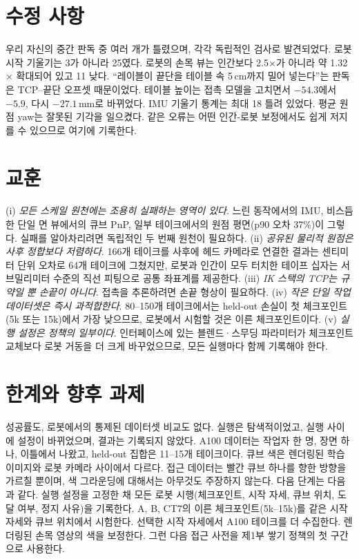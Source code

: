 \documentclass[conference,10pt]{IEEEtran}
\newcommand{\mm}{\,mm\xspace}
\begin{document}
\section{수정 사항}\label{p2:sec:corr}
우리 자신의 중간 판독 중 여러 개가 틀렸으며, 각각 독립적인 검사로 발견되었다. 로봇 시작 기울기는 3\textdegree{}가 아니라
25\textdegree{}였다. 로봇의 손목 뷰는 인간보다 2.5$\times$가 아니라 약 1.32$\times$ 확대되어 있고 11\textdegree{} 낮다.
``레이블이 끝단을 테이블 속 5\,cm까지 밀어 넣는다''는 판독은 TCP--끝단 오프셋 때문이었다. 테이블 높이는 접촉 모델을 고치면서
$-54.3$에서 $-5.9$, 다시 $-27.1$\mm{}로 바뀌었다. IMU 기울기 통계는 최대 18\textdegree{} 틀려 있었다. 평균 원점 yaw는 잘못된
기각을 일으켰다. 같은 오류는 어떤 인간-로봇 보정에서도 쉽게 저지를 수 있으므로 여기에 기록한다.

\section{교훈}\label{p2:sec:lessons}
(i) \emph{모든 스케일 원천에는 조용히 실패하는 영역이 있다}. 느린 동작에서의 IMU, 비스듬한 단일 면 뷰에서의 큐브 PnP,
일부 테이크에서의 원점 평면(p90 오차 37\%)이 그렇다. 실패를 알아차리려면 독립적인 두 번째 원천이 필요하다. (ii) \emph{공유된
물리적 원점은 사후 정합보다 저렴하다}. 166개 테이크를 사후에 헤드 카메라로 연결한 결과는 센티미터 단위 오차로 64개
테이크에 그쳤지만, 로봇과 인간이 모두 터치한 테이프 십자는 서브밀리미터 수준의 직선 피팅으로 공통 좌표계를 제공한다.
(iii) \emph{IK 스택의 TCP는 규약일 뿐 손끝이 아니다}. 접촉을 추론하려면 손끝 형상이 필요하다. (iv) \emph{작은 단일 작업
데이터셋은 즉시 과적합한다}. 80--150개 테이크에서는 held-out 손실이 첫 체크포인트(5k 또는 15k)에서 가장 낮으므로, 로봇에서
시험할 것은 이른 체크포인트이다. (v) \emph{실행 설정은 정책의 일부이다}. 인터페이스에 있는 블렌드·스무딩 파라미터가
체크포인트 교체보다 로봇 거동을 더 크게 바꾸었으므로, 모든 실행마다 함께 기록해야 한다.

\section{한계와 향후 과제}\label{p2:sec:lim}
성공률도, 로봇에서의 통제된 데이터셋 비교도 없다. 실행은 탐색적이었고, 실행 사이에 설정이 바뀌었으며, 결과는 기록되지
않았다. A100 데이터는 작업자 한 명, 장면 하나, 이틀에서 나왔고, held-out 집합은 11--15개 테이크이다. 큐브 색은 렌더링된
학습 이미지와 로봇 카메라 사이에서 다르다. 접근 데이터는 빨간 큐브 하나를 향한 방향을 가르칠 뿐이며, 색 그라운딩에
대해서는 아무것도 주장하지 않는다. 다음 단계는 다음과 같다. 실행 설정을 고정한 채 모든 로봇 시행(체크포인트, 시작 자세,
큐브 위치, 도달 여부, 정지 사유)을 기록한다. A, B, CT7의 이른 체크포인트(5k--15k)를 같은 시작 자세와 큐브 위치에서
시험한다. 선택한 시작 자세에서 A100 테이크를 더 수집한다. 렌더링된 손목 영상의 색을 보정한다. 그런 다음 접근 사전을
제1부 쌓기 정책의 첫 구간으로 사용한다.
\end{document}
